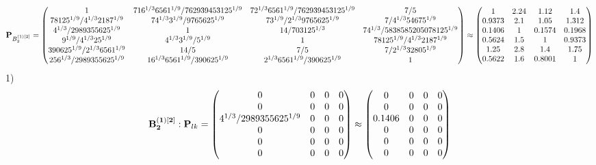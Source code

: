 \documentclass[10pt,a4paper]{article}
\begin{document}
	\[
		\bold{P}_{B_2^{(1)[2]}} = 
		\begin{pmatrix}
			{1}{} & {{7}{16^ {1 / 3}}{6561^ {1 / 9}}} / {{762939453125^ {1 / 9}}} & {{7}{2^ {1 / 3}}{6561^ {1 / 9}}} / {{762939453125^ {1 / 9}}} & {{7}} / {{5}} \\
			{{78125^ {1 / 9}}} / {{4^ {1 / 3}}{2187^ {1 / 9}}} & {{7}{4^ {1 / 3}}{3^ {1 / 9}}} / {{9765625^ {1 / 9}}} & {{7}{3^ {1 / 9}}} / {{2^ {1 / 3}}{9765625^ {1 / 9}}} & {{7}} / {{4^ {1 / 3}}{54675^ {1 / 9}}} \\
			{{4^ {1 / 3}}} / {{2989355625^ {1 / 9}}} & {1}{} & {{14}} / {{703125^ {1 / 3}}} & {{7}{4^ {1 / 3}}} / {{5838585205078125^ {1 / 9}}} \\
			{{9^ {1 / 9}}} / {{4^ {1 / 3}}{25^ {1 / 9}}} & {{4^ {1 / 3}}{3^ {1 / 9}}} / {{5^ {1 / 9}}} & {1}{} & {{78125^ {1 / 9}}} / {{4^ {1 / 3}}{2187^ {1 / 9}}} \\
			{{390625^ {1 / 9}}} / {{2^ {1 / 3}}{6561^ {1 / 9}}} & {{14}} / {{5}} & {{7}} / {{5}} & {{7}} / {{2^ {1 / 3}}{32805^ {1 / 9}}} \\
			{{256^ {1 / 3}}} / {{2989355625^ {1 / 9}}} & {{16^ {1 / 3}}{6561^ {1 / 9}}} / {{390625^ {1 / 9}}} & {{2^ {1 / 3}}{6561^ {1 / 9}}} / {{390625^ {1 / 9}}} & {1}{} \\
		\end{pmatrix}
		\approx
		\begin{pmatrix}
			1        & 2.24     & 1.12     & 1.4      \\
			0.9373   & 2.1      & 1.05     & 1.312    \\
			0.1406   & 1        & 0.1574   & 0.1968   \\
			0.5624   & 1.5      & 1        & 0.9373   \\
			1.25     & 2.8      & 1.4      & 1.75     \\
			0.5622   & 1.6      & 0.8001   & 1        \\
		\end{pmatrix}
	\]
	1)
	\[
		\bold{B_2^{(1)[2]}}: \bold{P}_{lk} = 
		\begin{pmatrix}
			{{0}}{} & {{0}}{} & {{0}}{} & {{0}}{} \\
			{{0}}{} & {{0}}{} & {{0}}{} & {{0}}{} \\
			{{4^ {1 / 3}}} / {{2989355625^ {1 / 9}}} & {{0}}{} & {{0}}{} & {{0}}{} \\
			{{0}}{} & {{0}}{} & {{0}}{} & {{0}}{} \\
			{{0}}{} & {{0}}{} & {{0}}{} & {{0}}{} \\
			{{0}}{} & {{0}}{} & {{0}}{} & {{0}}{} \\
		\end{pmatrix}
		\approx
		\begin{pmatrix}
			0        & 0        & 0        & 0        \\
			0        & 0        & 0        & 0        \\
			0.1406   & 0        & 0        & 0        \\
			0        & 0        & 0        & 0        \\
			0        & 0        & 0        & 0        \\
			0        & 0        & 0        & 0        \\
		\end{pmatrix}
	\]
\end{document}
